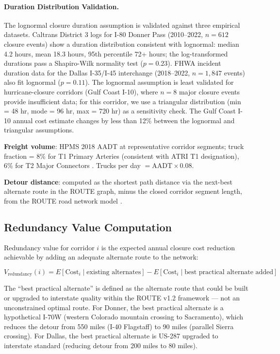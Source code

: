 \paragraph{Duration Distribution Validation.}
The lognormal closure duration assumption is validated against three empirical datasets.
Caltrans District 3 logs for I-80 Donner Pass (2010--2022, $n = 612$ closure events)
show a duration distribution consistent with lognormal: median 4.2 hours, mean 18.3 hours,
95th percentile 72+ hours; the log-transformed durations pass a Shapiro-Wilk normality
test ($p = 0.23$). FHWA incident duration data for the Dallas I-35/I-45 interchange
(2018--2022, $n = 1{,}847$ events) also fit lognormal ($p = 0.11$). The lognormal
assumption is least validated for hurricane-closure corridors (Gulf Coast I-10), where
$n = 8$ major closure events provide insufficient data; for this corridor, we use
a triangular distribution (min = 48 hr, mode = 96 hr, max = 720 hr) as a sensitivity
check. The Gulf Coast I-10 annual cost estimate changes by less than 12\% between
the lognormal and triangular assumptions.

\textbf{Freight volume}: HPMS 2018 AADT at representative corridor segments; truck
fraction = 8\% for T1 Primary Arteries (consistent with ATRI T1 designation), 6\% for
T2 Major Connectors \citep{ROUTE_A2}. Trucks per day $= \text{AADT} \times 0.08$.

\textbf{Detour distance}: computed as the shortest path distance via the next-best
alternate route in the ROUTE graph, minus the closed corridor segment length, from
the ROUTE road network model \citep{ROUTE_B1}.

\subsection{Redundancy Value Computation}

Redundancy value for corridor $i$ is the expected annual closure cost reduction achievable
by adding an adequate alternate route to the network:

\begin{equation}
V_\text{redundancy}(i) = E[\text{Cost}_i \mid \text{existing alternates}]
- E[\text{Cost}_i \mid \text{best practical alternate added}]
\end{equation}

The ``best practical alternate'' is defined as the alternate route that could be built or
upgraded to interstate quality within the ROUTE v1.2 framework --- not an unconstrained
optimal route. For Donner, the best practical alternate is a hypothetical I-70W
(western Colorado mountain crossing to Sacramento), which reduces the detour from 550
miles (I-40 Flagstaff) to 90 miles (parallel Sierra crossing). For Dallas, the best
practical alternate is US-287 upgraded to interstate standard (reducing detour from
200 miles to 80 miles).

